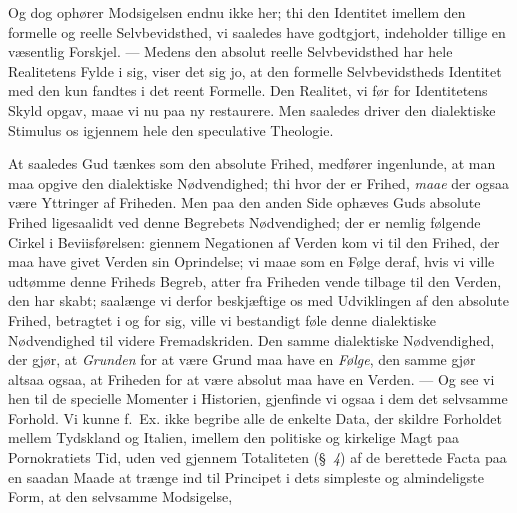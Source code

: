 \documentclass[12pt]{book}
\newcommand{\opage}[1]{\marginnote{\footnotesize\textit{[#1]}}}
\begin{document}
Og dog ophører Modsigelsen endnu ikke her; thi den Identitet imellem den
formelle og reelle Selvbevidsthed, vi saaledes have godtgjort, indeholder
tillige en væsentlig Forskjel. --- Medens den absolut reelle Selvbevidsthed har
hele Realitetens Fylde i sig, viser det sig jo, at den formelle
Selvbevidstheds Identitet med den kun fandtes i det reent Formelle. Den
Realitet, vi før for Identitetens Skyld opgav, maae vi nu paa ny restaurere.
Men saaledes driver den dialektiske Stimulus os igjennem hele den speculative
Theologie.

At saaledes Gud tænkes som den absolute Frihed, medfører ingenlunde, at man maa
opgive den dialektiske Nødvendighed; thi hvor der er Frihed, \emph{maae} der
ogsaa være Yttringer af Friheden. Men paa den anden Side ophæves Guds absolute
Frihed ligesaalidt ved denne Begrebets Nødvendighed; der er nemlig følgende
Cirkel i Beviisførelsen: giennem Negationen af Verden kom vi til den Frihed,
der maa
\opage{39} have givet Verden sin Oprindelse; vi maae som en Følge deraf, hvis vi ville
udtømme denne Friheds Begreb, atter fra Friheden vende tilbage til den Verden,
den har skabt; saalænge vi derfor beskjæftige os med Udviklingen af den absolute
Frihed, betragtet i og for sig, ville vi bestandigt føle denne dialektiske
Nødvendighed til videre Fremadskriden. Den samme dialektiske Nødvendighed, der
gjør, at \emph{Grunden} for at være Grund maa have en \emph{Følge}, den samme
gjør altsaa ogsaa, at Friheden for at være absolut maa have en Verden. --- Og
see vi hen til de specielle Momenter i Historien, gjenfinde vi ogsaa i dem det
selvsamme Forhold. Vi kunne f.~Ex. ikke begribe alle de enkelte Data, der
skildre Forholdet mellem Tydskland og Italien, imellem den politiske og
kirkelige Magt paa Pornokratiets Tid, uden ved gjennem Totaliteten
(§~\textit{4}) af de berettede Facta paa en saadan Maade at trænge ind til
Principet i dets simpleste og almindeligste Form, at den selvsamme Modsigelse,
\end{document}
